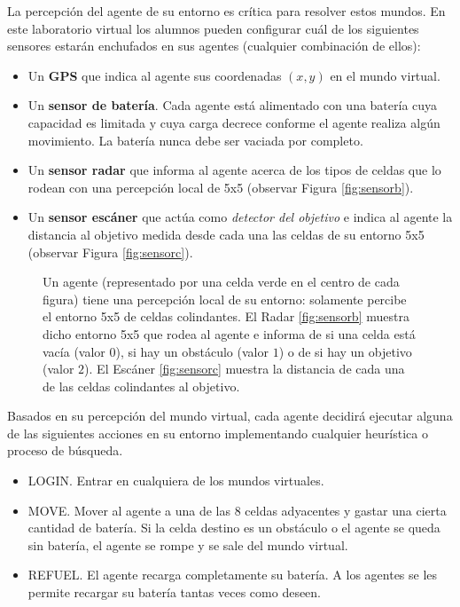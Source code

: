 La percepción del agente de su entorno es crítica para resolver estos mundos. En este laboratorio virtual los alumnos pueden configurar cuál de los siguientes sensores estarán enchufados en sus agentes (cualquier combinación de ellos):

\begin{itemize}
	\item Un \textbf{GPS} que indica al agente sus coordenadas $(x,y)$ en el mundo virtual.
	\item Un \textbf{sensor de batería}. Cada agente está alimentado con una batería cuya capacidad es limitada y cuya carga decrece conforme el agente realiza algún movimiento. La batería nunca debe ser vaciada por completo.
	\item Un \textbf{sensor radar} que informa al agente acerca de los tipos de celdas que lo rodean con una percepción local de 5x5 (observar Figura \ref{fig:sensorb}).
	\item Un \textbf{sensor escáner} que actúa como \emph{detector del objetivo} e indica al agente la distancia al objetivo medida desde cada una las celdas de su entorno 5x5 (observar Figura \ref{fig:sensorc}).
\end{itemize}

\begin{figure}[H]
\centering
{}\qquad
{}\qquad
{}%
\caption{Un agente (representado por una celda verde en el centro de cada figura) tiene una percepción local de su entorno: solamente percibe el entorno 5x5 de celdas colindantes. El Radar \ref{fig:sensorb} muestra dicho entorno 5x5 que rodea al agente e informa de si una celda está vacía (valor $0$), si hay un obstáculo (valor $1$) o de si hay un objetivo (valor $2$). El Escáner \ref{fig:sensorc} muestra la distancia de cada una de las celdas colindantes al objetivo.}
\label{fig:sensors}
\end{figure}

Basados en su percepción del mundo virtual, cada agente decidirá ejecutar alguna de las siguientes acciones en su entorno implementando cualquier heurística o proceso de búsqueda.

\begin{itemize}
	\item LOGIN. Entrar en cualquiera de los mundos virtuales.
	\item MOVE. Mover al agente a una de las $8$ celdas adyacentes y gastar una cierta cantidad de batería. Si la celda destino es un obstáculo o el agente se queda sin batería, el agente se rompe y se sale del mundo  virtual.
	\item REFUEL. El agente recarga completamente su batería. A los agentes se les permite recargar su batería tantas veces como deseen.
\end{itemize}

